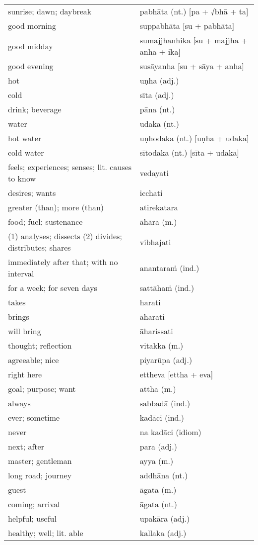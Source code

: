\documentclass[11pt,oneside]{memoir}
\begin{document}
\begin{center}
\begin{tabular}{ll}
sunrise; dawn; daybreak & pabhāta (nt.) [pa + √bhā + ta]\\[0pt]
good morning & suppabhāta [su + pabhāta]\\[0pt]
good midday & sumajjhanhika [su + majjha + anha + ika]\\[0pt]
good evening & susāyanha [su + sāya + anha]\\[0pt]
hot & uṇha (adj.)\\[0pt]
cold & sīta (adj.)\\[0pt]
drink; beverage & pāna (nt.)\\[0pt]
water & udaka (nt.)\\[0pt]
hot water & uṇhodaka (nt.) [uṇha + udaka]\\[0pt]
cold water & sītodaka (nt.) [sīta + udaka]\\[0pt]
feels; experiences; senses; lit. causes to know & vedayati\\[0pt]
desires; wants & icchati\\[0pt]
greater (than); more (than) & atirekatara\\[0pt]
food; fuel; sustenance & āhāra (m.)\\[0pt]
(1) analyses; dissects (2) divides; distributes; shares & vibhajati\\[0pt]
immediately after that; with no interval & anantaraṁ (ind.)\\[0pt]
for a week; for seven days & sattāhaṁ (ind.)\\[0pt]
takes & harati\\[0pt]
brings & āharati\\[0pt]
will bring & āharissati\\[0pt]
thought; reflection & vitakka (m.)\\[0pt]
agreeable; nice & piyarūpa (adj.)\\[0pt]
right here & ettheva [ettha + eva]\\[0pt]
goal; purpose; want & attha (m.)\\[0pt]
always & sabbadā (ind.)\\[0pt]
ever; sometime & kadāci (ind.)\\[0pt]
never & na kadāci (idiom)\\[0pt]
next; after & para (adj.)\\[0pt]
master; gentleman & ayya (m.)\\[0pt]
long road; journey & addhāna (nt.)\\[0pt]
guest & āgata (m.)\\[0pt]
coming; arrival & āgata (nt.)\\[0pt]
helpful; useful & upakāra (adj.)\\[0pt]
healthy; well; lit. able & kallaka (adj.)\\[0pt]
\end{tabular}
\end{center}
\end{document}
